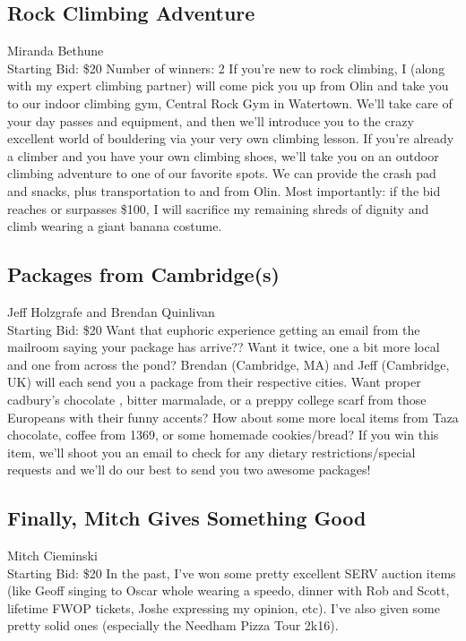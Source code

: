 \documentclass[11pt]{article}
\begin{document}
\subsection{Rock Climbing Adventure}
Miranda Bethune
\\
Starting Bid: \$20
\newline
Number of winners: 2
\newline
If you're new to rock climbing, I (along with my expert climbing partner) will come pick you up from Olin and take you to our indoor climbing gym, Central Rock Gym in Watertown. We'll take care of your day passes and equipment, and then we'll introduce you to the crazy excellent world of bouldering via your very own climbing lesson. If you're already a climber and you have your own climbing shoes, we'll take you on an outdoor climbing adventure to one of our favorite spots. We can provide the crash pad and snacks, plus transportation to and from Olin. Most importantly: if the bid reaches or surpasses \$100, I will sacrifice my remaining shreds of dignity and climb wearing a giant banana costume.
\subsection{Packages from Cambridge(s)}
Jeff Holzgrafe and Brendan Quinlivan
\\
Starting Bid: \$20
\newline
Want that euphoric experience getting an email from the mailroom saying your package has arrive?? Want it twice, one a bit more local and one from across the pond? Brendan (Cambridge, MA) and Jeff (Cambridge, UK) will each send you a package from their respective cities.  Want proper cadbury's chocolate , bitter marmalade, or a preppy college scarf  from those Europeans with their funny accents?  How about some more local items from Taza chocolate, coffee from 1369, or some homemade cookies/bread? If you win this item, we’ll shoot you an email to check for any dietary restrictions/special requests and we’ll do our best to send you two awesome packages!
\subsection{Finally, Mitch Gives Something Good}
Mitch Cieminski
\\
Starting Bid: \$20
\newline
In the past, I've won some pretty excellent SERV auction items (like Geoff singing to Oscar whole wearing a speedo, dinner with Rob and Scott, lifetime FWOP tickets, Joshe expressing my opinion, etc). I've also given some pretty solid ones (especially the Needham Pizza Tour 2k16). 
\end{document}
